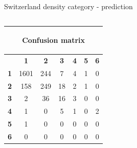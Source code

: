 \documentclass[c]{beamer}
\begin{document}
\begin{frame}
\begin{columns}
\begin{column}{0.5\textwidth}
\begin{overlayarea}{\linewidth}{4cm}
  \end{overlayarea}
  \begin{overlayarea}{\linewidth}{0.5cm}
    \centering
    \tiny Switzerland density category - prediction\par
  \end{overlayarea}
 \end{column}
\end{columns}
\begin{columns}
 \begin{column}{0.5\textwidth}
 \begin{overlayarea}{\linewidth}{2cm}
  \begin{table}
  \begin{center}
  \begin{adjustbox}{max width=0.7\textwidth}
  {\tiny
  \begin{tabular}{|c|c|c|c|c|c|c|}
    \hline
    \multicolumn{7}{|c|}{{\tiny \begin{bf}Confusion matrix\end{bf}}} \\
    \hline
     & \textbf{1} & \textbf{2} & \textbf{3} & \textbf{4} & \textbf{5} & \textbf{6}\\
    \hline
    \textbf{1} & 1601 & 244 & 7 & 4 & 1 & 0\\
    \hline
    \textbf{2} & 158 & 249 & 18 & 2 & 1 & 0\\
    \hline
    \textbf{3} & 2 & 36 & 16 & 3 & 0 & 0\\
    \hline
    \textbf{4} & 1 & 0 & 5 & 1 & 0 & 2\\
    \hline
    \textbf{5} & 1 & 0 & 0 & 0 & 0 & 0\\
    \hline
    \textbf{6} & 0 & 0 & 0 & 0 & 0 & 0\\
    \hline
  \end{tabular}
  }
  \end{adjustbox}
  \end{center}
  \end{table}
 \end{overlayarea}
 \end{column}
 \begin{column}{0.5\textwidth}
 \begin{overlayarea}{\linewidth}{2cm}
  \begin{table}
    \begin{center}
    \begin{adjustbox}{max width=0.4\textwidth}
    {\tiny 
    \begin{tabular}{|c|c|}
      \hline

\end{tabular}}
\end{adjustbox}
\end{center}
\end{table}
\end{overlayarea}
\end{column}
\end{columns}
\end{frame}
\end{document}

